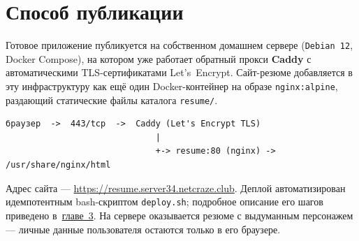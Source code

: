 \section{Способ публикации}

Готовое приложение публикуется на собственном домашнем сервере
(\texttt{Debian~12}, Docker Compose), на котором уже работает обратный прокси
\textbf{Caddy} с автоматическими TLS-сертификатами Let's~Encrypt. Сайт-резюме
добавляется в эту инфраструктуру как ещё один Docker-контейнер на образе
\texttt{nginx:alpine}, раздающий статические файлы каталога \texttt{resume/}.

\begin{lstlisting}[caption={Маршрут запроса до сайта},captionpos=b]
браузер  ->  443/tcp  ->  Caddy (Let's Encrypt TLS)
                              |
                              +-> resume:80 (nginx) -> /usr/share/nginx/html
\end{lstlisting}

Адрес сайта --- \url{https://resume.server34.netcraze.club}. Деплой
автоматизирован идемпотентным bash-скриптом \texttt{deploy.sh}; подробное
описание его шагов приведено в~\hyperref[ch:practice]{главе~3}. На сервере
оказывается резюме с выдуманным персонажем --- личные данные пользователя
остаются только в его браузере.

\endinput
